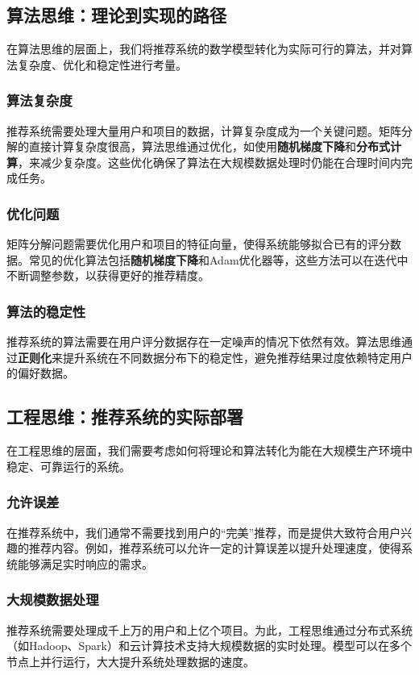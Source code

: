 \subsection{ 算法思维：理论到实现的路径}

在算法思维的层面上，我们将推荐系统的数学模型转化为实际可行的算法，并对算法复杂度、优化和稳定性进行考量。

\subsubsection*{算法复杂度}

推荐系统需要处理大量用户和项目的数据，计算复杂度成为一个关键问题。矩阵分解的直接计算复杂度很高，算法思维通过优化，如使用{\bf 随机梯度下降}和{\bf 分布式计算}，来减少复杂度。这些优化确保了算法在大规模数据处理时仍能在合理时间内完成任务。

\subsubsection*{优化问题}

矩阵分解问题需要优化用户和项目的特征向量，使得系统能够拟合已有的评分数据。常见的优化算法包括{\bf 随机梯度下降}和{Adam}优化器等，这些方法可以在迭代中不断调整参数，以获得更好的推荐精度。

\subsubsection*{算法的稳定性}
推荐系统的算法需要在用户评分数据存在一定噪声的情况下依然有效。算法思维通过{\bf 正则化}来提升系统在不同数据分布下的稳定性，避免推荐结果过度依赖特定用户的偏好数据。

\subsection{ 工程思维：推荐系统的实际部署}

在工程思维的层面，我们需要考虑如何将理论和算法转化为能在大规模生产环境中稳定、可靠运行的系统。

\subsubsection*{允许误差}
在推荐系统中，我们通常不需要找到用户的“完美”推荐，而是提供大致符合用户兴趣的推荐内容。例如，推荐系统可以允许一定的计算误差以提升处理速度，使得系统能够满足实时响应的需求。

\subsubsection*{大规模数据处理}
推荐系统需要处理成千上万的用户和上亿个项目。为此，工程思维通过分布式系统（如Hadoop、Spark）和云计算技术支持大规模数据的实时处理。模型可以在多个节点上并行运行，大大提升系统处理数据的速度。


